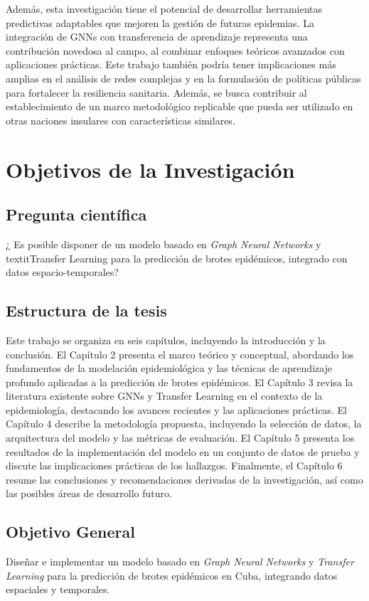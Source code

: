 Además, esta investigación tiene el potencial de desarrollar herramientas predictivas adaptables que mejoren la gestión de futuras epidemias. La integración de GNNs con transferencia de aprendizaje representa una contribución novedosa al campo, al combinar enfoques teóricos avanzados con aplicaciones prácticas. Este trabajo también podría tener implicaciones más amplias en el análisis de redes complejas y en la formulación de políticas públicas para fortalecer la resiliencia sanitaria. Además, se busca contribuir al establecimiento de un marco metodológico replicable que pueda ser utilizado en otras naciones insulares con características similares.

\section*{Objetivos de la Investigación}
\subsection*{Pregunta científica}
¿ Es posible disponer de un modelo basado en \textit{Graph Neural Networks} y textit{Transfer Learning} para la predicción de brotes epidémicos, integrado con datos espacio-temporales?

\subsection*{Estructura de la tesis}
Este trabajo se organiza en seis capítulos, incluyendo la introducción y la conclusión. El Capítulo 2 presenta el marco teórico y conceptual, abordando los fundamentos de la modelación epidemiológica y las técnicas de aprendizaje profundo aplicadas a la predicción de brotes epidémicos. El Capítulo 3 revisa la literatura existente sobre GNNs y Transfer Learning en el contexto de la epidemiología, destacando los avances recientes y las aplicaciones prácticas. El Capítulo 4 describe la metodología propuesta, incluyendo la selección de datos, la arquitectura del modelo y las métricas de evaluación. El Capítulo 5 presenta los resultados de la implementación del modelo en un conjunto de datos de prueba y discute las implicaciones prácticas de los hallazgos. Finalmente, el Capítulo 6 resume las conclusiones y recomendaciones derivadas de la investigación, así como las posibles áreas de desarrollo futuro.

\subsection*{Objetivo General}
Diseñar e implementar un modelo basado en \textit{Graph Neural Networks} y \textit{Transfer Learning} para la predicción de brotes epidémicos en Cuba, integrando datos espaciales y temporales.

